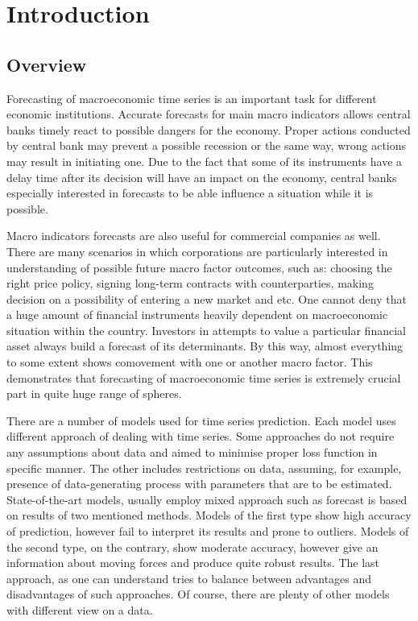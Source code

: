 \documentclass[a4paper, 14pt]{article}
\begin{document}
\section{Introduction}
\subsection{Overview}
Forecasting of macroeconomic time series is an important task for different economic institutions. Accurate forecasts for main macro indicators allows central banks timely react to possible dangers for the economy. Proper actions conducted by central bank may prevent a possible recession or the same way, wrong actions may result in initiating one. Due to the fact that some of its instruments have a delay time after its decision will have an impact on the economy, central banks especially interested in forecasts to be able influence a situation while it is possible. 

Macro indicators forecasts are also useful for commercial companies as well. There are many scenarios in which corporations are particularly interested in understanding of possible future macro factor outcomes, such as: choosing the right price policy, signing long-term contracts with counterparties, making decision on a possibility of entering a new market and etc. One cannot deny that a huge amount of financial instruments heavily dependent on macroeconomic situation within the country. Investors in attempts to value a particular financial asset always build a forecast of its determinants. By this way, almost everything to some extent shows comovement with one or another macro factor. This demonstrates that forecasting of macroeconomic time series is extremely crucial part in quite huge range of spheres.  

There are a number of models used for time series prediction. Each model uses different approach of dealing with time series. Some approaches do not require any assumptions about data and aimed to minimise proper loss function in specific manner. The other includes restrictions on data, assuming, for example, presence of data-generating process with parameters that are to be estimated. State-of-the-art models, usually employ mixed approach such as forecast is based on results of two mentioned methods. Models of the first type show high accuracy of prediction, however fail to interpret its results and prone to outliers. Models of the second type, on the contrary, show moderate accuracy, however give an information about moving forces and produce quite robust results. The last approach, as one can understand tries to balance between advantages and disadvantages of such approaches. Of course, there are plenty of other models with different view on a data. 
\end{document}
